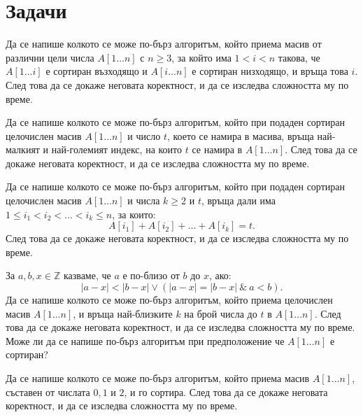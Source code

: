 \section{Задачи}

\begin{problem}
Да се напише колкото се може по-бърз алгоритъм, който приема масив от различни цели числа $A[1 \dots n]$ с $n \geq 3$, за който има $1 < i < n$ такова, че $A[1 \dots i]$ е сортиран възходящо и $A[i \dots n]$ е сортиран низходящо, и връща това $i$.
След това да се докаже неговата коректност, и да се изследва сложността му по време.
\end{problem}

\begin{problem}
Да се напише колкото се може по-бърз алгоритъм, който при подаден сортиран целочислен масив $A[1 \dots n]$ и число $t$, което се намира в масива, връща най-малкият и най-големият индекс, на които $t$ се намира в $A[1 \dots n]$.
След това да се докаже неговата коректност, и да се изследва сложността му по време.
\end{problem}

\begin{problem}
Да се напише колкото се може по-бърз алгоритъм, който при подаден сортиран целочислен масив $A[1 \dots n]$ и числа $k \geq 2$ и $t$, връща дали има $1 \leq i_1 < i_2 < \dots < i_k \leq n$, за които:
\[
    A[i_1] + A[i_2] + \dots + A[i_k] = t.
\]
След това да се докаже неговата коректност, и да се изследва сложността му по време.
\end{problem}

\begin{problem}
За $a, b, x \in \mathbb{Z}$ казваме, че $a$ е по-близо от $b$ до $x$, ако:
\[
    |a - x| < |b - x| \lor (|a - x| = |b - x| \: \& \: a < b).
\]
Да се напише колкото се може по-бърз алгоритъм, който приема целочислен масив $A[1 \dots n]$, и връща най-близките $k$ на брой числа до $t$ в $A[1 \dots n]$.
След това да се докаже неговата коректност, и да се изследва сложността му по време.
Може ли да се напише по-бърз алгоритъм при предположение че $A[1 \dots n]$ е сортиран?
\end{problem}

\begin{problem}
Да се напише колкото се може по-бърз алгоритъм, който приема масив $A[1 \dots n]$, съставен от числата $0, 1$ и $2$, и го сортира.
След това да се докаже неговата коректност, и да се изследва сложността му по време.
\end{problem}

